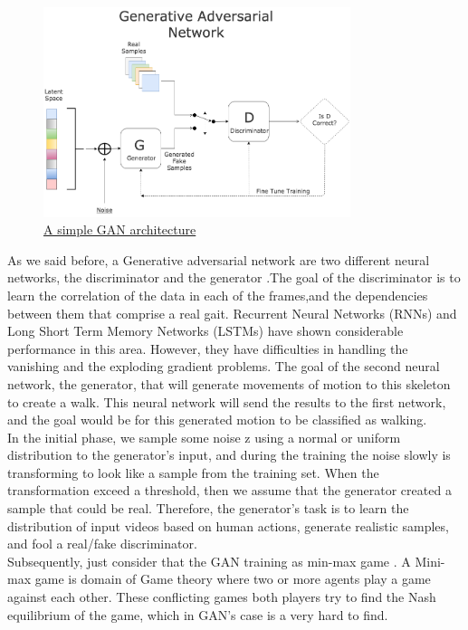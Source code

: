  
 \begin{figure}[h]
	\centering
	\includegraphics[width=0.8\textwidth]{figures/background/GAN.png}
	\caption{\href{https://bolster.ai/blog/content/images/2020/04/GAN-1.png}
	{A simple GAN architecture}}
\end{figure}


As we said before, a Generative adversarial network are two different neural networks, the discriminator and the generator .The goal of the discriminator is to learn the correlation of the data in each of the frames,and the dependencies between them that comprise a real gait. Recurrent Neural Networks (RNNs) and Long Short Term Memory Networks (LSTMs) have shown considerable performance in this area. However, they have difficulties in handling the vanishing and the exploding gradient problems. The goal of the second neural network, the generator, that will generate movements of motion to this skeleton to create a walk. This neural network will send the results to the first network, and the goal would be for this generated motion to be classified as walking. \\


In the initial phase, we sample some noise z using a normal or uniform distribution to the generator's input, and during the training the noise slowly is transforming to look like a sample from the training set. When the transformation exceed a threshold, then we assume that the generator created a sample that could be real. Therefore, the generator's task is to learn the distribution of input videos based on human actions, generate realistic samples, and fool a real/fake discriminator.\\

Subsequently, just consider that the GAN training as min-max game \cite{Human Action Generation with Generative Adversarial Networks}. A Mini-max game is domain of Game theory where two or more agents play a game against each other. These conflicting games both players try to find the Nash equilibrium of the game, which in GAN's case is a very hard to find. 

